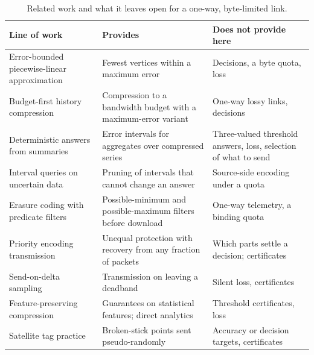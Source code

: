 \begin{table}[t]
\centering
\caption{Related work and what it leaves open for a one-way, byte-limited link.}
\label{tab:novelty}
\footnotesize
\begin{tabularx}{\textwidth}{@{}>{\raggedright\arraybackslash}p{3.4cm}>{\raggedright\arraybackslash}X>{\raggedright\arraybackslash}X@{}}
\toprule
Line of work & Provides & Does not provide here \\
\midrule
Error-bounded piecewise-linear approximation \citep{imai1988,orourke1981,lin2025} & Fewest vertices within a maximum error & Decisions, a byte quota, loss \\
Budget-first history compression \citep{deligiannakis2007} & Compression to a bandwidth budget with a maximum-error variant & One-way lossy links, decisions \\
Deterministic answers from summaries \citep{brito2017platodb,lin2019plato} & Error intervals for aggregates over compressed series & Three-valued threshold answers, loss, selection of what to send \\
Interval queries on uncertain data \citep{cheng2003probabilistic} & Pruning of intervals that cannot change an answer & Source-side encoding under a quota \\
Erasure coding with predicate filters \citep{taurone2024treat} & Possible-minimum and possible-maximum filters before download & One-way telemetry, a binding quota \\
Priority encoding transmission \citep{albanese1996,boucheron2000pet} & Unequal protection with recovery from any fraction of packets & Which parts settle a decision; certificates \\
Send-on-delta sampling \citep{diazcacho2017sod} & Transmission on leaving a deadband & Silent loss, certificates \\
Feature-preserving compression \citep{munizcuza2025cameo,sun2025shrink} & Guarantees on statistical features; direct analytics & Threshold certificates, loss \\
Satellite tag practice \citep{boehme2009,photopoulou2015} & Broken-stick points sent pseudo-randomly & Accuracy or decision targets, certificates \\
\bottomrule
\end{tabularx}
\end{table}
